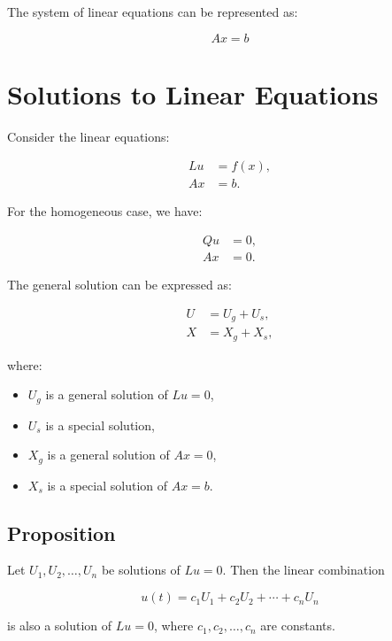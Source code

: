 \documentclass[11pt]{article}
\begin{document}
The system of linear equations can be represented as:

\begin{equation}
    Ax = b
\end{equation}





\section*{Solutions to Linear Equations}

Consider the linear equations:

\begin{align}
    Lu &= f(x), \\
    Ax &= b.
\end{align}

For the homogeneous case, we have:

\begin{align}
    Qu &= 0, \\
    Ax &= 0.
\end{align}

The general solution can be expressed as:

\begin{align}
    U &= U_g + U_s, \\
    X &= X_g + X_s,
\end{align}

where:
\begin{itemize}
    \item $U_g$ is a general solution of $Lu = 0$,
    \item $U_s$ is a special solution,
    \item $X_g$ is a general solution of $Ax = 0$,
    \item $X_s$ is a special solution of $Ax = b$.
\end{itemize}

\subsection*{Proposition}

Let $U_1, U_2, \ldots, U_n$ be solutions of $Lu = 0$. Then the linear combination

\begin{equation}
    u(t) = c_1 U_1 + c_2 U_2 + \cdots + c_n U_n
\end{equation}

is also a solution of $Lu = 0$, where $c_1, c_2, \ldots, c_n$ are constants.
\end{document}
